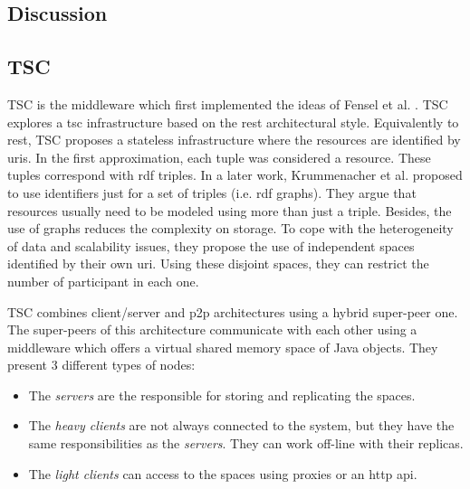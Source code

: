 



\subsection{Discussion}






\subsection{TSC}
TSC \citep{fensel_tsc_2007} is the middleware which first implemented the ideas of Fensel et al. \citep{fensel_triple-space_2004}.
TSC explores a \acl{tsc} infrastructure based on the \ac{rest} architectural style.
Equivalently to \ac{rest}, TSC proposes a stateless infrastructure where the resources are identified by \acp{uri}.
In the first approximation, each tuple was considered a resource.
These tuples correspond with \ac{rdf} triples.
In a later work,  Krummenacher et al. \citep{krummenacher2006specification} proposed to use identifiers just for a set of triples (i.e. \ac{rdf} graphs).
They argue that resources usually need to be modeled using more than just a triple.
Besides, the use of graphs reduces the complexity on storage.
To cope with the heterogeneity of data and scalability issues, they propose the use of independent spaces identified by their own \ac{uri}.
Using these disjoint spaces, they can restrict the number of participant in each one.


TSC combines client/server and \ac{p2p} architectures using a hybrid super-peer one.
The super-peers of this architecture communicate with each other using a middleware which offers a virtual shared memory space of Java objects.
They present 3 different types of nodes:
\begin{itemize}
  \item The \emph{servers} are the responsible for storing and replicating the spaces.
  \item The \emph{heavy clients} are not always connected to the system, but they have the same responsibilities as the \emph{servers}.
	They can work off-line with their replicas.
  \item The \emph{light clients} can access to the spaces using proxies or an \ac{http} \acs{api}.
\end{itemize}


